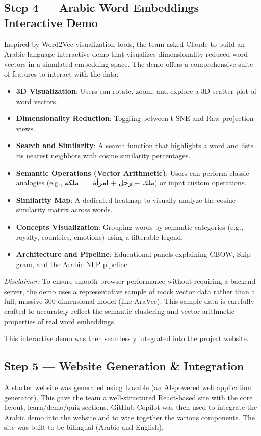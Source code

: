 \subsection{Step 4 — Arabic Word Embeddings Interactive Demo}
Inspired by Word2Vec visualization tools, the team asked Claude to build an Arabic-language interactive demo that visualizes dimensionality-reduced word vectors in a simulated embedding space. The demo offers a comprehensive suite of features to interact with the data:
\begin{itemize}
    \item \textbf{3D Visualization}: Users can rotate, zoom, and explore a 3D scatter plot of word vectors.
    \item \textbf{Dimensionality Reduction}: Toggling between t-SNE and Raw projection views.
    \item \textbf{Search and Similarity}: A search function that highlights a word and lists its nearest neighbors with cosine similarity percentages.
    \item \textbf{Semantic Operations (Vector Arithmetic)}: Users can perform classic analogies (e.g., \textarabic{ملك} $-$ \textarabic{رجل} $+$ \textarabic{امرأة} $=$ \textarabic{ملكة}) or input custom operations.
    \item \textbf{Similarity Map}: A dedicated heatmap to visually analyze the cosine similarity matrix across words.
    \item \textbf{Concepts Visualization}: Grouping words by semantic categories (e.g., royalty, countries, emotions) using a filterable legend.
    \item \textbf{Architecture and Pipeline}: Educational panels explaining CBOW, Skip-gram, and the Arabic NLP pipeline.
\end{itemize}

\textit{Disclaimer:} To ensure smooth browser performance without requiring a backend server, the demo uses a representative sample of mock vector data rather than a full, massive 300-dimensional model (like AraVec). This sample data is carefully crafted to accurately reflect the semantic clustering and vector arithmetic properties of real word embeddings.

This interactive demo was then seamlessly integrated into the project website.

\subsection{Step 5 — Website Generation \& Integration}
A starter website was generated using Lovable (an AI-powered web application generator). This gave the team a well-structured React-based site with the core layout, learn/demo/quiz sections. GitHub Copilot was then used to integrate the Arabic demo into the website and to wire together the various components. The site was built to be bilingual (Arabic and English).

